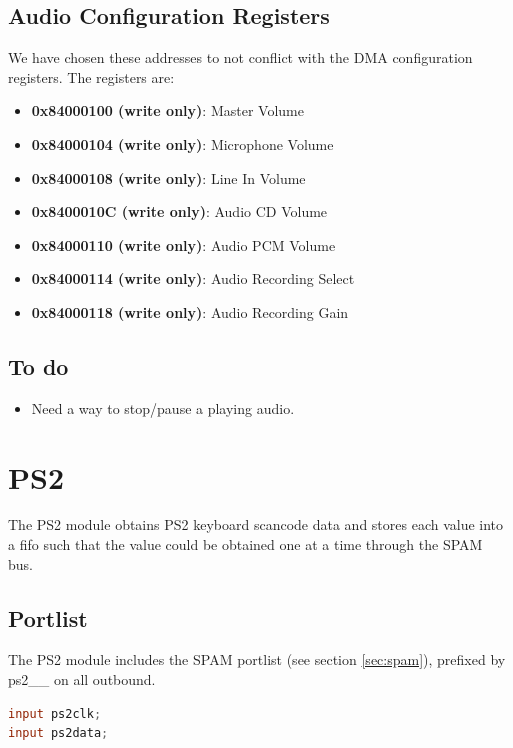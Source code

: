 \documentclass[10pt]{article}
\begin{document}
\subsection{Audio Configuration Registers}

We have chosen these addresses to not conflict with the DMA configuration
registers.  The registers are:

\begin{itemize}
\item{\textbf{0x84000100 (write only)}: Master Volume}
\item{\textbf{0x84000104 (write only)}: Microphone Volume}
\item{\textbf{0x84000108 (write only)}: Line In Volume}
\item{\textbf{0x8400010C (write only)}: Audio CD Volume}
\item{\textbf{0x84000110 (write only)}: Audio PCM Volume}
\item{\textbf{0x84000114 (write only)}: Audio Recording Select}
\item{\textbf{0x84000118 (write only)}: Audio Recording Gain}
\end{itemize}

\subsection{To do}

\begin{itemize}
\item{Need a way to stop/pause a playing audio.}
\end{itemize}

\section{PS2}
\label{sec:ps2}

The PS2 module obtains PS2 keyboard scancode data and stores each value into
a fifo such that the value could be obtained one at a time through the SPAM
bus.

\subsection{Portlist}

The PS2 module includes the SPAM portlist (see section \ref{sec:spam}),
prefixed by ps2\_\_ on all outbound.

\begin{lstlisting}[basicstyle=\footnotesize,language=Verilog]
input ps2clk;
input ps2data;
\end{lstlisting}
\end{document}
